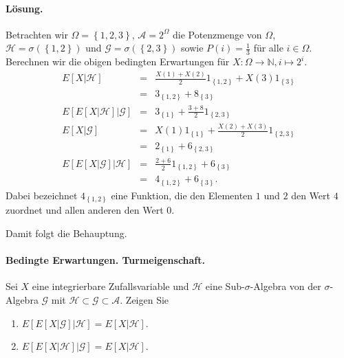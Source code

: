 \paragraph*{Lösung. } 
Betrachten wir $\Omega=\left\{ 1,2,3 \right\}$, $\mathcal A=2^\Omega$ die Potenzmenge von $\Omega$,
$\mathcal H=\sigma\left( \left\{ 1,2 \right\} \right)$ und 
$\mathcal G=\sigma\left( \left\{ 2,3 \right\} \right)$ sowie 
$P\left( i \right)=\frac{1}{3}$ für alle $i\in\Omega$. Berechnen wir die obigen bedingten
Erwartungen für $X:\Omega\to\mathbb N, i\mapsto 2^i$.
\begin{eqnarray*}
	E\left[ X|\mathcal H \right] &=&
	\frac{X\left( 1 \right)+X\left( 2 \right)}{2}1_{\left\{ 1,2 \right\}} + X\left( 3 \right) 1_{ \left\{ 3 \right\} } \\
	&=& 3_{  \left\{ 1,2 \right\} } + 8_{ \left\{ 3 \right\}  } \\ 
	E\left[ E\left[ X|\mathcal H \right]|\mathcal G \right] 
	&=& 3_{ \left\{ 1 \right\} } + \frac{3+8}{2} 1_{ \left\{ 2,3 \right\} } \\
	E\left[ X|\mathcal G \right] &=& 
	X\left( 1 \right) 1_{ \left\{ 1 \right\} } + \frac{X\left( 2 \right)+X\left( 3 \right)}{2}1_{ \left\{ 2,3 \right\} } \\
	&=& 2_{ \left\{ 1 \right\} } + 6_{ \left\{ 2,3 \right\} } \\
	E\left[ E\left[ X|\mathcal G \right]| \mathcal H \right] 
	&=& \frac{2+6}{2}1_{ \left\{ 1,2 \right\} } + 6_{ \left\{ 3 \right\} } \\
	&=& 4_{ \left\{ 1,2 \right\} } + 6_{ \left\{ 3 \right\} }.
\end{eqnarray*}
Dabei bezeichnet $4_{ \left\{ 1,2 \right\} }$ eine Funktion, die den Elementen $1$ und $2$
den Wert $4$ zuordnet und allen anderen den Wert $0$.

Damit folgt die Behauptung. 


\paragraph{Bedingte Erwartungen. Turmeigenschaft. } Sei $X$ eine integrierbare
Zufallsvariable und $\mathcal H$ eine Sub-$\sigma$-Algebra von der
$\sigma$-Algebra $\mathcal G$ mit $\mathcal H \subset \mathcal G \subset
\mathcal A$. Zeigen Sie
\begin{enumerate}
    \item $E\left[ E\left[ X | \mathcal G \right] | \mathcal H \right] =
        E \left[ X | \mathcal H \right]$.
    \item $E\left[ E\left[ X | \mathcal H \right] | \mathcal G \right] =
        E \left[ X | \mathcal H \right]$.
\end{enumerate}

